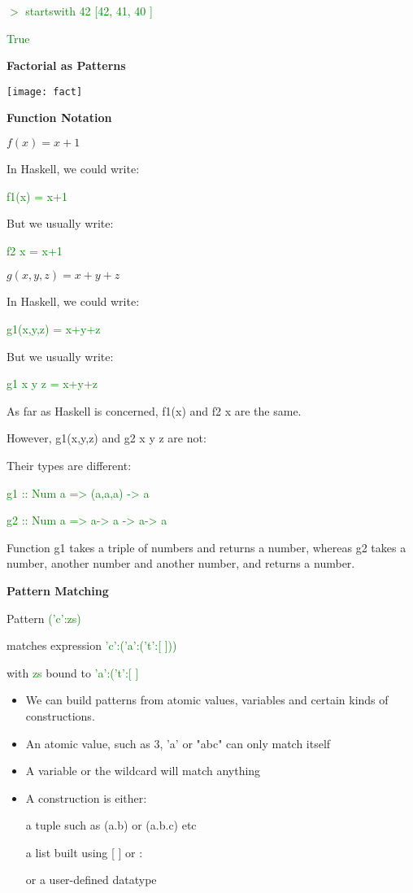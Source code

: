 \documentclass{article}
\begin{document}
\textcolor{green}{$>$ startswith 42 [42, 41, 40 ]}

\textcolor{green}{True}


\textbf{Factorial as Patterns}

\texttt{[image: fact]}


\textbf{Function Notation}

$f(x) = x + 1$

In Haskell, we could write:

\textcolor{green}{f1(x) = x+1}

But we usually write:

\textcolor{green}{f2  x = x+1}


$g(x,y,z) = x + y + z$

In Haskell, we could write:

\textcolor{green}{g1(x,y,z) = x+y+z}

But we usually write:

\textcolor{green}{g1  x  y  z  = x+y+z }


As far as Haskell is concerned, f1(x) and f2  x  are the same.

However, g1(x,y,z) and g2  x  y  z  are not:

Their types are different:

\textcolor{green}{g1 :: Num a => (a,a,a) -> a}

\textcolor{green}{g2 :: Num a => a-> a ->  a-> a}

Function g1 takes a triple of numbers and returns a number, whereas g2 takes a number, another number and another number, and returns a number.


\textbf{Pattern Matching}

Pattern \textcolor{green}{('c':zs)}

matches expression \textcolor{green}{'c':('a':('t':[ ]))}

with \textcolor{green}{zs} bound to \textcolor{green}{'a':('t':[ ]}

\begin{itemize}
  \item We can build patterns from atomic values, variables and certain kinds of constructions.
  \item An atomic value, such as 3, 'a' or "abc" can only match itself
  \item A variable or the wildcard \textunderscore will match anything
  \item A construction is either:

a tuple such as (a.b) or (a.b.c) etc

a list built using [ ] or :

or a user-defined datatype

\end{itemize}
\end{document}
